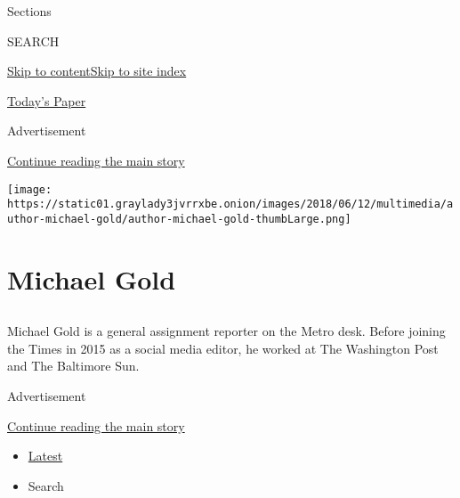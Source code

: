 Sections

SEARCH

\protect\hyperlink{site-content}{Skip to
content}\protect\hyperlink{site-index}{Skip to site index}

\href{https://myaccount.nytimes3xbfgragh.onion/auth/login?response_type=cookie\&client_id=vi}{}

\href{https://www.nytimes3xbfgragh.onion/section/todayspaper}{Today's
Paper}

Advertisement

\protect\hyperlink{after-top}{Continue reading the main story}

\texttt{[image: https://static01.graylady3jvrrxbe.onion/images/2018/06/12/multimedia/author-michael-gold/author-michael-gold-thumbLarge.png]}

\hypertarget{michael-gold}{%
\section{Michael Gold}\label{michael-gold}}

\subsection{}

Michael Gold is a general assignment reporter on the Metro desk. Before
joining the Times in 2015 as a social media editor, he worked at The
Washington Post and The Baltimore Sun.

Advertisement

\protect\hyperlink{after-mid1}{Continue reading the main story}

\begin{itemize}
\tightlist
\item
  \protect\hyperlink{stream-panel}{Latest}
\item
  Search
\end{itemize}

